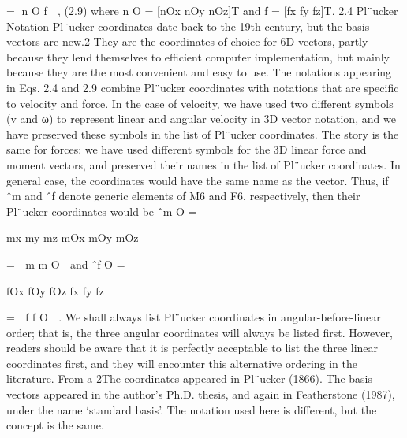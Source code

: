= n O f  , (2.9) where n O = [nOx nOy nOz]T and f = [fx fy fz]T. 2.4 Pl¨ucker Notation Pl¨ucker coordinates date back to the 19th century, but the basis vectors are new.2 They are the coordinates of choice for 6D vectors, partly because they lend themselves to efficient computer implementation, but mainly because they are the most convenient and easy to use. The notations appearing in Eqs. 2.4 and 2.9 combine Pl¨ucker coordinates with notations that are specific to velocity and force. In the case of velocity, we have used two different symbols (v and ω) to represent linear and angular velocity in 3D vector notation, and we have preserved these symbols in the list of Pl¨ucker coordinates. The story is the same for forces: we have used different symbols for the 3D linear force and moment vectors, and preserved their names in the list of Pl¨ucker coordinates. In general case, the coordinates would have the same name as the vector. Thus, if ˆm and ˆf denote generic elements of M6 and F6, respectively, then their Pl¨ucker coordinates would be ˆm O =

mx my mz mOx mOy mOz

=  m m O  and ˆf O =

fOx fOy fOz fx fy fz

=  f f O  . We shall always list Pl¨ucker coordinates in angular-before-linear order; that is, the three angular coordinates will always be listed first. However, readers should be aware that it is perfectly acceptable to list the three linear coordinates first, and they will encounter this alternative ordering in the literature. From a 2The coordinates appeared in Pl¨ucker (1866). The basis vectors appeared in the author’s Ph.D. thesis, and again in Featherstone (1987), under the name ‘standard basis’. The notation used here is different, but the concept is the same.

